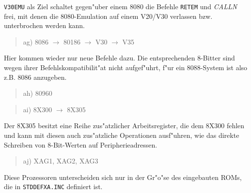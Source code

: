 \documentclass[12pt,a4paper,twoside]{report}
\newcommand{\tty}[1]{{\tt #1}}
\begin{document}
{\tt V30EMU} als Ziel schaltet gegen"uber einem 8080 die Befehle {\tt RETEM}
und {\em CALLN} frei, mit denen die 8080-Emulation auf einem V20/V30
verlassen bzw. unterbrochen werden kann.
\begin{quote}
ag) 8086 $\rightarrow$ 80186 $\rightarrow$ V30 $\rightarrow$ V35
\end{quote}
Hier kommen wieder nur neue Befehle dazu.  Die entsprechenden 8-Bitter sind
wegen ihrer Befehlskompatibilit"at nicht aufgef"uhrt, f"ur ein 8088-System
ist also z.B. 8086 anzugeben.
\begin{quote}
ah) 80960
\end{quote}
\begin{quote}
ai) 8X300 $\rightarrow$ 8X305
\end{quote}
Der 8X305 besitzt eine Reihe zus"atzlicher Arbeitsregister, die dem
8X300 fehlen und kann mit diesen auch zus"atzliche Operationen ausf"uhren,
wie das direkte Schreiben von 8-Bit-Werten auf Peripherieadressen.
\begin{quote}
aj) XAG1, XAG2, XAG3
\end{quote}
Diese Prozessoren unterscheiden sich nur in der Gr"o"se des eingebauten
ROMs, die in \tty{STDDEFXA.INC} definiert ist.
\end{document}
